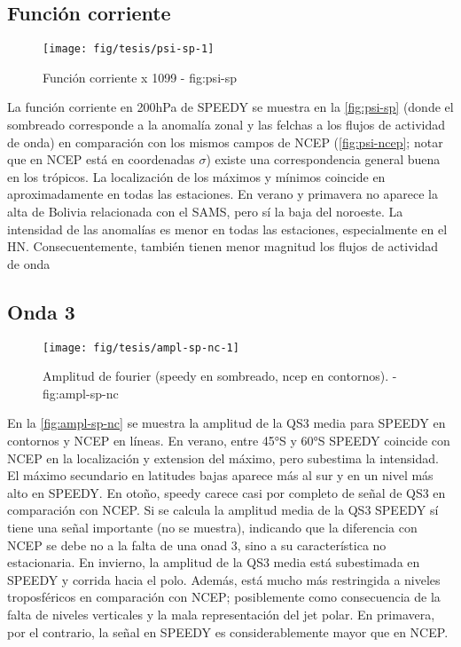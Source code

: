 \documentclass[spanish,a4paper]{book}
\begin{document}
\subsection{Función corriente}\label{funcion-corriente-2}

\begin{landscape}\begin{figure}

{\centering \texttt{[image: fig/tesis/psi-sp-1]} 

}

\caption{Función corriente x 1099 - fig:psi-sp}\label{fig:psi-sp}
\end{figure}
\end{landscape}

La función corriente en 200hPa de SPEEDY se muestra en la
\autoref{fig:psi-sp} (donde el sombreado corresponde a la anomalía zonal
y las felchas a los flujos de actividad de onda) en comparación con los
mismos campos de NCEP (\autoref{fig:psi-ncep}; notar que en NCEP está en
coordenadas \(\sigma\)) existe una correspondencia general buena en los
trópicos. La localización de los máximos y mínimos coincide en
aproximadamente en todas las estaciones. En verano y primavera no
aparece la alta de Bolivia relacionada con el SAMS, pero sí la baja del
noroeste. La intensidad de las anomalías es menor en todas las
estaciones, especialmente en el HN. Consecuentemente, también tienen
menor magnitud los flujos de actividad de onda

\subsection{Onda 3}\label{onda-3-1}

\begin{figure*}
\texttt{[image: fig/tesis/ampl-sp-nc-1]} \caption{Amplitud de fourier (speedy en sombreado, ncep en contornos). - fig:ampl-sp-nc}\label{fig:ampl-sp-nc}
\end{figure*}

En la \autoref{fig:ampl-sp-nc} se muestra la amplitud de la QS3 media
para SPEEDY en contornos y NCEP en líneas. En verano, entre 45°S y 60°S
SPEEDY coincide con NCEP en la localización y extension del máximo, pero
subestima la intensidad. El máximo secundario en latitudes bajas aparece
más al sur y en un nivel más alto en SPEEDY. En otoño, speedy carece
casi por completo de señal de QS3 en comparación con NCEP. Si se calcula
la amplitud media de la QS3 SPEEDY sí tiene una señal importante (no se
muestra), indicando que la diferencia con NCEP se debe no a la falta de
una onad 3, sino a su característica no estacionaria. En invierno, la
amplitud de la QS3 media está subestimada en SPEEDY y corrida hacia el
polo. Además, está mucho más restringida a niveles troposféricos en
comparación con NCEP; posiblemente como consecuencia de la falta de
niveles verticales y la mala representación del jet polar. En primavera,
por el contrario, la señal en SPEEDY es considerablemente mayor que en
NCEP.
\end{document}
